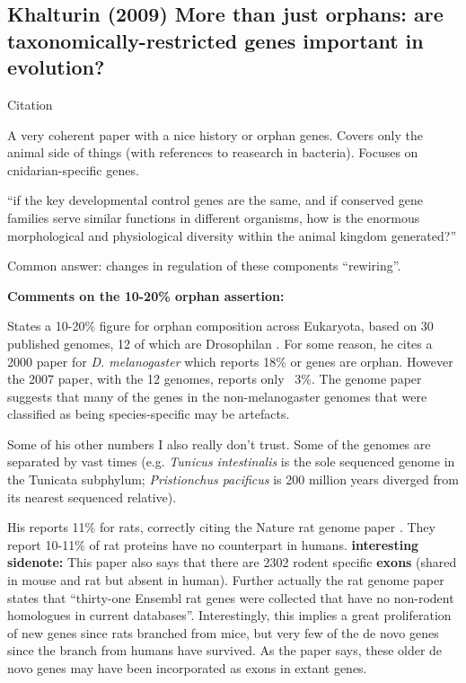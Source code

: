 \subsection{Khalturin (2009) More than just orphans: are
taxonomically-restricted genes important in evolution?}

    Citation \cite{khalturin_more_2009}

    A very coherent paper with a nice history or orphan genes. Covers only
    the animal side of things (with references to reasearch in bacteria).
    Focuses on cnidarian-specific genes.

    ``if the key developmental control genes are the same, and if conserved
    gene families serve similar functions in different organisms, how is
    the enormous morphological and physiological diversity within the
    animal kingdom generated?''

    Common answer: changes in regulation of these components ``rewiring''.

    \textbf{Comments on the 10-20\% orphan assertion:}

    States a 10-20\% figure for orphan composition across Eukaryota, based
    on 30 published genomes, 12 of which are Drosophilan
    \cite{clark_evolution_2007}. For some reason, he cites a 2000 paper for
    \textit{D. melanogaster} which reports 18\% or genes are orphan.
    However the 2007 paper, with the 12 genomes, reports only ~3\%. The
    genome paper suggests that many of the genes in the non-melanogaster
    genomes that were classified as being species-specific may be
    artefacts.

    Some of his other numbers I also really don't trust. Some of the
    genomes are separated by vast times (e.g. \textit{Tunicus intestinalis}
    is the sole sequenced genome in the Tunicata subphylum;
    \textit{Pristionchus pacificus} is 200 million years diverged from its
    nearest sequenced relative).
    
    His reports 11\% for rats, correctly citing the Nature rat genome paper
    \cite{gibbs_genome_2004}.  They report 10-11\% of rat proteins have no
    counterpart in humans.  \textbf{interesting sidenote:} This paper also
    says that there are 2302 rodent specific \textbf{exons} (shared in
    mouse and rat but absent in human).  Further actually the rat genome
    paper states that ``thirty-one Ensembl rat genes were collected that
    have no non-rodent homologues in current databases''. Interestingly,
    this implies a great proliferation of new genes since rats branched
    from mice, but very few of the de novo genes since the branch from
    humans have survived. As the paper says, these older de novo genes may
    have been incorporated as exons in extant genes.


